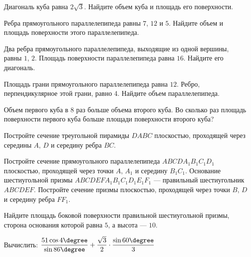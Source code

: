 \begin{class}[number=5]
	\begin{listofex}
		\item Диагональ куба равна \( 2\sqrt{3} \). Найдите объем куба и площадь его поверхности.
		\item Ребра прямоугольного параллелепипеда равны \( 7 \), \( 12 \) и \( 5 \).
		Найдите объем и площадь поверхности этого параллелепипеда.
		\item Два ребра прямоугольного параллелепипеда, выходящие из одной вершины, равны \( 1 \), \( 2 \).
		Площадь поверхности параллелепипеда равна \( 16 \). Найдите его диагональ.
		\item Площадь грани прямоугольного параллелепипеда равна \( 12 \). Ребро, перпендикулярное этой грани, равно 4. Найдите объем параллелепипеда.
		\item Объем первого куба в \( 8 \) раз больше объема второго куба.
		Во сколько раз площадь поверхности первого куба больше площади поверхности второго куба?
		\item Постройте сечение треугольной пирамиды \( DABC \) плоскостью,
		проходящей через середины \( A \), \( D \) и середину ребра \( BC \).
		\item Постройте сечение прямоугольного параллелепипеда \( ABCDA_1B_1C_1D_1 \)
		плоскостью, проходящей через точки \( A \), \( A_1 \) и середину \( B_1C_1 \).
		Основание шестиугольной призмы \( ABCDEFA_1B_1C_1D_1E_1F_1 \) ---
		правильный шестиугольник \( ABCDEF \).
		Постройте сечение призмы плоскостью,
		проходящей через точки \( B \), \( D \) и середину ребра \( FF_1 \).
		\item Найдите площадь боковой поверхности правильной шестиугольной призмы, сторона основания которой равна \( 5 \), а высота  --- \( 10 \).
		\item Вычислить: \( \dfrac{51\cos 4\degree}{\sin 86\degree}+\dfrac{\sqrt{3}}{2}\cdot\dfrac{\sin 60\degree}{3} \)
	\end{listofex}
\end{class}

